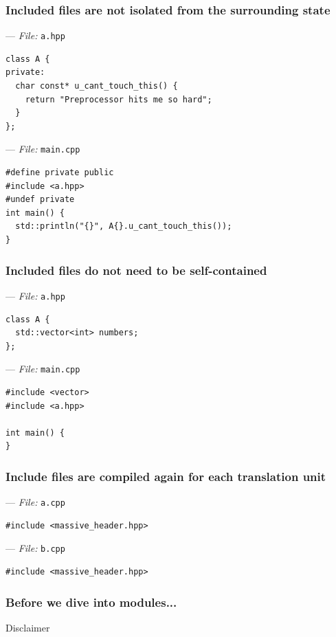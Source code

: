 \documentclass[aspectratio=169]{beamer}
\newif\iftransitions
\newcommand{\cpause}{\iftransitions \pause \fi}
\begin{document}
\begin{frame}[fragile]
  \frametitle{Included files are not isolated from the surrounding state}
  
  --- \textit{File:} \texttt{a.hpp}
  \begin{lstlisting}[style=cpp20]
class A {
private:
  char const* u_cant_touch_this() {
    return "Preprocessor hits me so hard";
  }
};
  \end{lstlisting}
  \cpause
  --- \textit{File:} \texttt{main.cpp}
  \begin{lstlisting}[style=cpp20]
#define private public
#include <a.hpp>
#undef private
int main() {
  std::println("{}", A{}.u_cant_touch_this());
}
  \end{lstlisting}
\end{frame}

\begin{frame}[fragile]
  \frametitle{Included files do not need to be self-contained}
  
  --- \textit{File:} \texttt{a.hpp}
  \begin{lstlisting}[style=cpp20]
class A {
  std::vector<int> numbers;
};
  \end{lstlisting}

  --- \textit{File:} \texttt{main.cpp}
  \begin{lstlisting}[style=cpp20]
#include <vector>
#include <a.hpp>

int main() {
}
  \end{lstlisting}
\end{frame}

\begin{frame}[fragile]
  \frametitle{Include files are compiled again for each translation unit}
  
    --- \textit{File:} \texttt{a.cpp}
  \begin{lstlisting}[style=cpp20]
#include <massive_header.hpp>
  \end{lstlisting}

  --- \textit{File:} \texttt{b.cpp}
  \begin{lstlisting}[style=cpp20]
#include <massive_header.hpp>
  \end{lstlisting}
\end{frame}

\begin{frame}
  \frametitle{Before we dive into modules...}
  
  \begin{center}
  \huge{Disclaimer}
  \end{center}
\end{frame}
\end{document}
